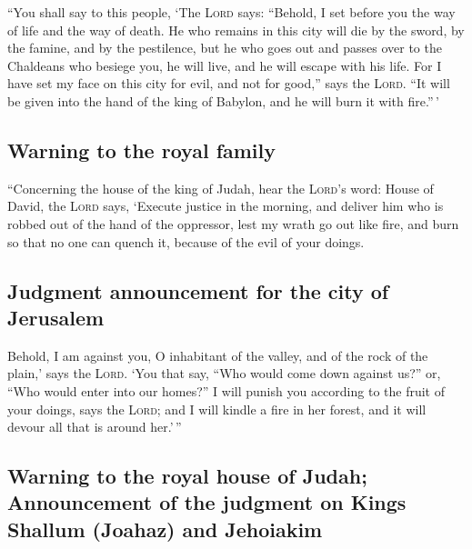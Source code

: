  ``You shall say to this people, `The \textsc{Lord} says:
``Behold, I set before you the way of life and the way of death.
 He who remains in this city will die by the sword, by the
famine, and by the pestilence, but he who goes out and passes over to
the Chaldeans who besiege you, he will live, and he will escape with his
life.  For I have set my face on this city for evil, and
not for good,'' says the \textsc{Lord}. ``It will be given into the hand
of the king of Babylon, and he will burn it with fire.''\,'

\hypertarget{warning-to-the-royal-family}{%
\subsection{Warning to the royal
family}\label{warning-to-the-royal-family}}

 ``Concerning the house of the king of Judah, hear the
\textsc{Lord}'s word:  House of David, the \textsc{Lord}
says, `Execute justice in the morning, and deliver him who is robbed out
of the hand of the oppressor, lest my wrath go out like fire, and burn
so that no one can quench it, because of the evil of your doings.

\hypertarget{judgment-announcement-for-the-city-of-jerusalem}{%
\subsection{Judgment announcement for the city of
Jerusalem}\label{judgment-announcement-for-the-city-of-jerusalem}}

 Behold, I am against you, O inhabitant of the valley,
and of the rock of the plain,' says the \textsc{Lord}. `You that say,
``Who would come down against us?'' or, ``Who would enter into our
homes?''  I will punish you according to the fruit of
your doings, says the \textsc{Lord}; and I will kindle a fire in her
forest, and it will devour all that is around her.'\,''

\hypertarget{warning-to-the-royal-house-of-judah-announcement-of-the-judgment-on-kings-shallum-joahaz-and-jehoiakim}{%
\subsection{Warning to the royal house of Judah; Announcement of the
judgment on Kings Shallum (Joahaz) and
Jehoiakim}\label{warning-to-the-royal-house-of-judah-announcement-of-the-judgment-on-kings-shallum-joahaz-and-jehoiakim}}

